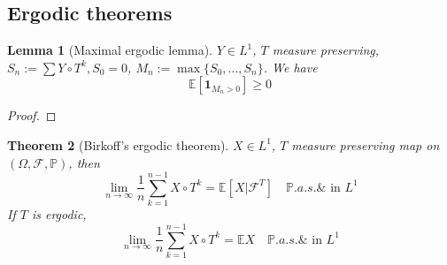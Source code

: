 \documentclass[a4paper,11pt]{book}
\newtheorem{theorem}{Theorem}[section]
\newtheorem{lemma}[theorem]{Lemma}
\theoremstyle{definition}
\theoremstyle{remark}
\begin{document}
\subsection{Ergodic theorems}
\begin{lemma}[Maximal ergodic lemma]
$Y \in L^1$, $T$ measure preserving, $S_n := \sum Y \circ T^k, S_0 = 0$,  $M_n := \max \{ S_0, \dots, S_n \}$. We have
\begin{equation*}
	\mathbb{E}[\textbf{1}_{M_n > 0}] \geq 0
\end{equation*}
\end{lemma}
\begin{proof}
\end{proof}

\begin{theorem}[Birkoff's ergodic theorem]
$X \in L^1$, $T$ measure preserving map on $(\Omega, \mathcal{F}, \mathbb{P})$, then 
\begin{equation*}
	\lim_{n \rightarrow \infty} \frac{1}{n} \sum_{k = 1}^{n-1} X \circ T^k = \mathbb{E}[X|\mathcal{F}^T] \quad \mathbb{P}.a.s. \& \text{ in $L^1$}
\end{equation*}
If $T$ is ergodic,
\begin{equation*}
	\lim_{n \rightarrow \infty} \frac{1}{n} \sum_{k = 1}^{n-1} X \circ T^k = \mathbb{E}X \quad \mathbb{P}.a.s. \& \text{ in $L^1$}
\end{equation*}
\end{theorem}
\end{document}
